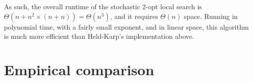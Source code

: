 \documentclass[10pt]{extarticle}
\begin{document}
As such, the overall runtime of the stochastic 2-opt local search is
$\Theta(n + n^2 \times (n + n)) = \Theta(n^3)$, and it requires $\Theta(n)$
space. Running in polynomial time, with a fairly small exponent, and in linear
space, this algorithm is much more efficient than Held-Karp's implementation
above. \medskip



\section{Empirical comparison}
\end{document}
